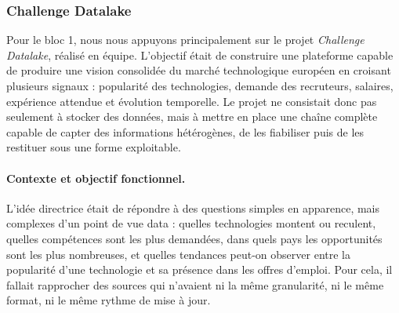 \documentclass{article}
\begin{document}
\subsubsection{Challenge Datalake}

Pour le bloc 1, nous nous appuyons principalement sur le projet \textit{Challenge
Datalake}, réalisé en équipe. L'objectif était de construire une plateforme capable
de produire une vision consolidée du marché technologique européen en croisant
plusieurs signaux : popularité des technologies, demande des recruteurs, salaires,
expérience attendue et évolution temporelle. Le projet ne consistait donc pas
seulement à stocker des données, mais à mettre en place une chaîne complète capable
de capter des informations hétérogènes, de les fiabiliser puis de les restituer sous
une forme exploitable.

\paragraph{Contexte et objectif fonctionnel.}
L'idée directrice était de répondre à des questions simples en apparence, mais
complexes d'un point de vue data : quelles technologies montent ou reculent,
quelles compétences sont les plus demandées, dans quels pays les opportunités sont
les plus nombreuses, et quelles tendances peut-on observer entre la popularité
d'une technologie et sa présence dans les offres d'emploi. Pour cela, il fallait
rapprocher des sources qui n'avaient ni la même granularité, ni le même format,
ni le même rythme de mise à jour.
\end{document}
